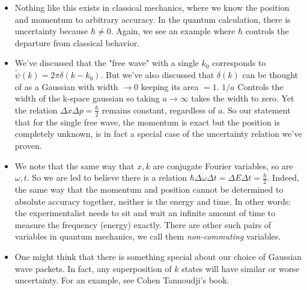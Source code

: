 \documentclass{Textbook}
\begin{document}
\begin{itemize}
  \item Nothing like this exists in classical mechanics, where we know the position and momentum to arbitrary accuracy. In the quantum calculation, there is uncertainty because $\hbar\ne 0$. Again, we see an example where $\hbar$ controls the departure from classical behavior.
  \item We've discussed that the "free wave" with a single $k_0$ corresponds to $\tilde{\psi}(k) = 2\pi\delta(k-k_0)$. But we've also discussed that $\delta(k)$ can be thought of as a Gaussian with width $\rightarrow 0$ keeping its area $=1$. $1/a$ Controls the width of the k-space gaussian so taking $a\rightarrow \infty$ takes the width to zero. Yet the relation $\Delta x \Delta p = \frac{\hbar}{2}$ remains constant, regardless of $a$. So our statement that for the single free wave, the momentum is exact but the position is completely unknown, is in fact a special case of the uncertainty relation we've proven.
  \item We note that the same way that $x,k$ are conjugate Fourier variables, so are $\omega,t$. So we are led to believe there is a relation $\hbar \Delta \omega \Delta t = \Delta E \Delta t = \frac{\hbar}{2}$. Indeed, the same way that the momentum and position cannot be determined to absolute accuracy together, neither is the energy and time. In other words: the experimentalist needs to sit and wait an infinite amount of time to measure the frequency (energy) exactly. There are other such pairs of variables in quantum mechanics, we call them \emph{non-commuting} variables.
  \item One might think that there is something special about our choice of Gaussian wave packets. In fact, any superposition of $k$ states will have similar or worse uncertainty. For an example, see Cohen Tannoudji's book.
\end{itemize}
\end{document}

